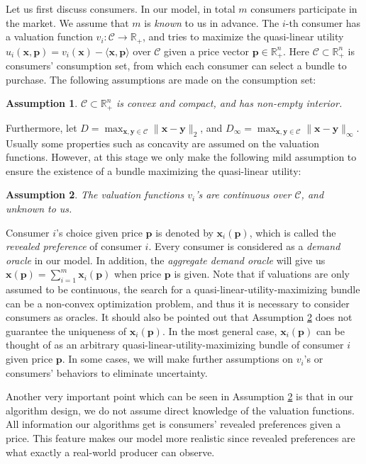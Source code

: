 \documentclass{article}
\newtheorem{assumption}{Assumption}[section]
\begin{document}
Let us first discuss consumers. In our model, in total $m$ consumers participate in the market. We assume that $m$ is \emph{known} to us in advance. The $i$-th consumer has a valuation function $v_i:\mathcal{C}\to \mathbb{R}_+$, and tries to maximize the quasi-linear utility $u_i(\mathbf{x},\mathbf{p})=v_i(\mathbf{x})-\langle \mathbf{x},\mathbf{p}\rangle$ over $\mathcal{C}$ given a price vector $\mathbf{p}\in \mathbb{R}_+^n$. Here $\mathcal{C}\subset \mathbb{R}_+^n$ is consumers' consumption set, from which each consumer can select a bundle to purchase. The following assumptions are made on the consumption set:
\begin{assumption}\label{consSet}
    $\mathcal{C}\subset \mathbb{R}_+^n$ is convex and compact, and has non-empty interior.
\end{assumption}
Furthermore, let $D=\max_{\mathbf{x},\mathbf{y}\in \mathcal{C}}\|\mathbf{x}-\mathbf{y}\|_2$, and $D_{\infty}=\max_{\mathbf{x},\mathbf{y}\in \mathcal{C}}\|\mathbf{x}-\mathbf{y}\|_{\infty}$. \\

Usually some properties such as concavity are assumed on the valuation functions. However, at this stage we only make the following mild assumption to ensure the existence of a bundle maximizing the quasi-linear utility:
\begin{assumption}\label{valMild}
    The valuation functions $v_i$'s are continuous over $\mathcal{C}$, and unknown to us.
\end{assumption}
Consumer $i$'s choice given price $\mathbf{p}$ is denoted by $\mathbf{x}_i(\mathbf{p})$, which is called the \emph{revealed preference} of consumer $i$. Every consumer is considered as a \emph{demand oracle} in our model. In addition, the \emph{aggregate demand oracle} will give us $\mathbf{x}(\mathbf{p})=\sum_{i=1}^{m}\mathbf{x}_i(\mathbf{p})$ when price $\mathbf{p}$ is given. Note that if valuations are only assumed to be continuous, the search for a quasi-linear-utility-maximizing bundle can be a non-convex optimization problem, and thus it is necessary to consider consumers as oracles. It should also be pointed out that Assumption \ref{valMild} does not guarantee the uniqueness of $\mathbf{x}_i(\mathbf{p})$. In the most general case, $\mathbf{x}_i(\mathbf{p})$ can be thought of as an arbitrary quasi-linear-utility-maximizing bundle of consumer $i$ given price $\mathbf{p}$. In some cases, we will make further assumptions on $v_i$'s or consumers' behaviors to eliminate uncertainty.

Another very important point which can be seen in Assumption \ref{valMild} is that in our algorithm design, we do not assume direct knowledge of the valuation functions. All information our algorithms get is consumers' revealed preferences given a price. This feature makes our model more realistic since revealed preferences are what exactly a real-world producer can observe. \\
\end{document}

